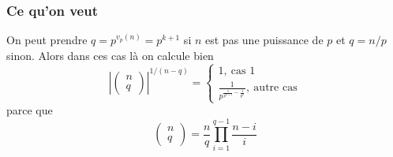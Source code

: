 \documentclass[a4paper,12pt]{article}
\theoremstyle{plain}
\theoremstyle{definition}
\theoremstyle{remark}
\begin{document}
\subsubsection{Ce qu'on veut}
On peut prendre $q=p^{v_p(n)}=p^{k+1}$ si $n$ est pas une
puissance de $p$ et $q=n/p$ sinon. Alors dans ces cas
là on calcule bien
\[|\begin{pmatrix} n\\ q\end{pmatrix}|^{1/(n-q)}=\begin{cases} 1,~\textrm{cas 1}\\\frac{1}{p^{\frac{1}{p^{k+1}}-\frac{1}{p^{k}}}},~\textrm{autre cas}\end{cases}\]
parce que 
\[\begin{pmatrix} n\\ q\end{pmatrix}=\frac{n}{q}\prod_{i=1}^{q-1}\frac{n-i}{i}\]
\end{document}
